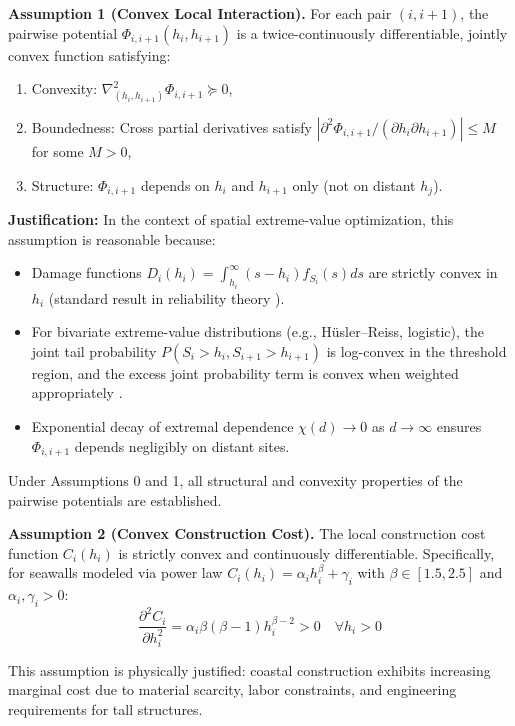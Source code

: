 \documentclass[12pt]{article}
\theoremstyle{definition}
\begin{document}
\begin{boxed}
\textbf{Assumption 1 (Convex Local Interaction).}
For each pair $(i, i+1)$, the pairwise potential $\Phi_{i,i+1}(h_i, h_{i+1})$ is a twice-continuously differentiable, jointly convex function satisfying:
\begin{enumerate}
    \item Convexity: $\nabla_{(h_i,h_{i+1})}^2 \Phi_{i,i+1} \succeq 0$,
    \item Boundedness: Cross partial derivatives satisfy $|\partial^2\Phi_{i,i+1}/(\partial h_i \partial h_{i+1})| \leq M$ for some $M>0$,
    \item Structure: $\Phi_{i,i+1}$ depends on $h_i$ and $h_{i+1}$ only (not on distant $h_j$).
\end{enumerate}

\noindent\textbf{Justification:} In the context of spatial extreme-value optimization, this assumption is reasonable because:
\begin{itemize}
    \item Damage functions $D_i(h_i) = \int_{h_i}^\infty (s-h_i) f_{S_i}(s)ds$ are strictly convex in $h_i$ (standard result in reliability theory \cite{Rockafellar:ConvexAnalysis}).
    \item For bivariate extreme-value distributions (e.g., Hüsler–Reiss, logistic), the joint tail probability $P(S_i > h_i, S_{i+1} > h_{i+1})$ is log-convex in the threshold region, and the excess joint probability term is convex when weighted appropriately \cite{Coles:ExtremeStats, Sorensen:Reliability}.
    \item Exponential decay of extremal dependence $\chi(d) \to 0$ as $d\to\infty$ ensures $\Phi_{i,i+1}$ depends negligibly on distant sites.
\end{itemize}

\noindent Under Assumptions 0 and 1, all structural and convexity properties of the pairwise potentials are established.
\end{boxed}

\begin{boxed}
\textbf{Assumption 2 (Convex Construction Cost).}
The local construction cost function $C_i(h_i)$ is strictly convex and continuously differentiable. Specifically, for seawalls modeled via power law $C_i(h_i) = \alpha_i h_i^\beta + \gamma_i$ with $\beta \in [1.5, 2.5]$ and $\alpha_i, \gamma_i > 0$:
\[
\frac{\partial^2 C_i}{\partial h_i^2} = \alpha_i \beta(\beta-1) h_i^{\beta-2} > 0 \quad \forall h_i > 0
\]

This assumption is physically justified: coastal construction exhibits increasing marginal cost due to material scarcity, labor constraints, and engineering requirements for tall structures.
\end{boxed}
\end{document}
